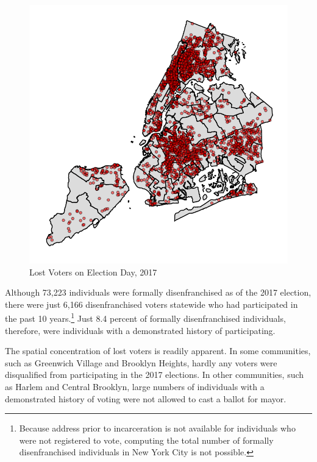\documentclass[12pt,]{article}
\let\rmarkdownfootnote\footnote%
\def\footnote{\protect\rmarkdownfootnote}
\begin{document}
\begin{figure}[H]

{\centering \includegraphics{p1_files/figure-latex/citywide-map-1} 

}

\caption{\label{fig:citymap}Lost Voters on Election Day, 2017}\label{fig:citywide-map}
\end{figure}

Although 73,223 individuals were formally disenfranchised as of the 2017 election, there were just 6,166 disenfranchised voters statewide who had participated in the past 10 years.\footnote{Because address prior to incarceration is not available for individuals who were not registered to vote, computing the total number of formally disenfranchised individuals in New York City is not possible.} Just 8.4 percent of formally disenfranchised individuals, therefore, were individuals with a demonstrated history of participating.

The spatial concentration of lost voters is readily apparent. In some communities, such as Greenwich Village and Brooklyn Heights, hardly any voters were disqualified from participating in the 2017 elections. In other communities, such as Harlem and Central Brooklyn, large numbers of individuals with a demonstrated history of voting were not allowed to cast a ballot for mayor.
\end{document}
